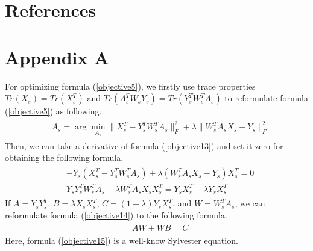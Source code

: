 \documentclass[review]{elsarticle}
\begin{document}
\section*{References}



\section*{Appendix A}
For optimizing formula (\ref{objective5}), we firstly use trace properties $Tr(X_{s})=Tr(X_{s}^{T})$ and $Tr(A_{s}^{T}W_{s}Y_{s})=Tr(Y_{s}^{T}W_{s}^{T}A_{s})$ to reformulate formula (\ref{objective5}) as following.
 \begin{align}
\label{objective13}
\begin{aligned}
&A_{s}=\arg \min_{A_{s}}\|X_{s}^{T}-Y_{s}^{T}W_{s}^{T}A_{s}\|^{2}_{F}+\lambda\|W_{s}^{T}A_{s}X_{s}-Y_{s}\|^{2}_{F}
 \end{aligned}
\end{align}
Then, we can take a derivative of formula (\ref{objective13}) and set it zero for obtaining the following formula.
 \begin{align}
\label{objective14}
\begin{aligned}
&-Y_{s}(X_{s}^{T}-Y_{s}^{T}W_{s}^{T}A_{s})+\lambda (W_{s}^{T}A_{s}X_{s}-Y_{s})X_{s}^{T}=0\\
&Y_{s}Y_{s}^{T}W_{s}^{T}A_{s}+\lambda W_{s}^{T}A_{s}X_{s}X_{s}^{T}=Y_{s}X_{s}^{T}+\lambda Y_{s}X_{s}^{T}
 \end{aligned}
\end{align}
If $A=Y_{s}Y_{s}^{T}$, $B=\lambda X_{s}X_{s}^{T}$, $C=(1+\lambda)Y_{s}X_{s}^{T}$, and $W=W_{s}^{T}A_{s}$, we can reformulate formula (\ref{objective14}) to the following formula.
\begin{align}
\label{objective15}
\begin{aligned}
&AW+WB=C
 \end{aligned}
\end{align}
Here, formula (\ref{objective15}) is a well-know Sylvester equation.
\end{document}

